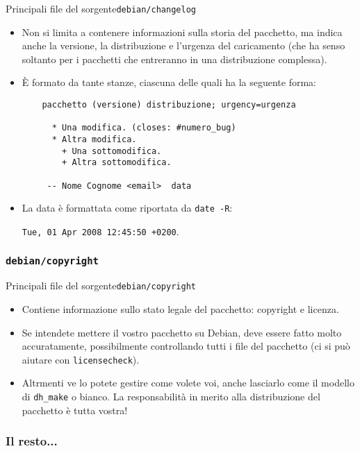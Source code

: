 \documentclass{beamer}
\begin{document}
\begin{frame}[fragile]{Principali file del sorgente}{{\tt debian/changelog}}
	\begin{itemize}
	\item Non si limita a contenere informazioni sulla storia del pacchetto, ma indica anche la versione, la distribuzione e l'urgenza del caricamento (che ha senso soltanto per i pacchetti che entreranno in una distribuzione complessa).
	\pause
	\item È formato da tante stanze, ciascuna delle quali ha la seguente forma:
	\scriptsize
	\begin{verbatim}
	pacchetto (versione) distribuzione; urgency=urgenza
	
	  * Una modifica. (closes: #numero_bug)
	  * Altra modifica.
	    + Una sottomodifica.
	    + Altra sottomodifica.
	
	 -- Nome Cognome <email>  data
	\end{verbatim}
	\normalsize
	\pause
	\item La data è formattata come riportata da {\tt date -R}:

	{\tt Tue, 01 Apr 2008 12:45:50 +0200}.
	\end{itemize}
\end{frame}

\subsubsection{{\tt debian/copyright}}

\begin{frame}{Principali file del sorgente}{{\tt debian/copyright}}
	\begin{itemize}
	\item Contiene informazione sullo stato legale del pacchetto: copyright e licenza.
	\pause
	\item Se intendete mettere il vostro pacchetto su Debian, deve essere fatto molto accuratamente, possibilmente controllando tutti i file del pacchetto (ci si può aiutare con {\tt licensecheck}).
	\pause
	\item Altrmenti ve lo potete gestire come volete voi, anche lasciarlo come il modello di {\tt dh\_make} o bianco. La responsabilità in merito alla distribuzione del pacchetto è tutta vostra!
	\end{itemize}
\end{frame}

\subsubsection{Il resto...}
\end{document}
